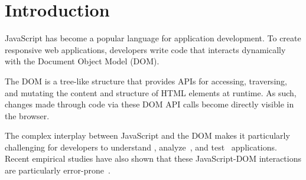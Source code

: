 \section{Introduction}
%
JavaScript has become a popular language for application development. 
To create responsive web applications, developers write \js code that interacts dynamically with the Document Object Model (DOM). 

The DOM is a tree-like structure that provides APIs \cite{w3dom} for accessing, traversing, and mutating the content and structure of HTML elements at runtime. As such, changes made through \js code via these DOM API calls become directly visible in the browser. 

The complex interplay between JavaScript and the DOM makes it particularly challenging for developers to understand \cite{clematisICSE14}, analyze~\cite{staticJsFSE11, staticJsFSE13}, and test~\cite{artemis, pythia} \js applications. Recent empirical studies have also shown that these JavaScript-DOM interactions are particularly error-prone~\cite{frolin2013}.

